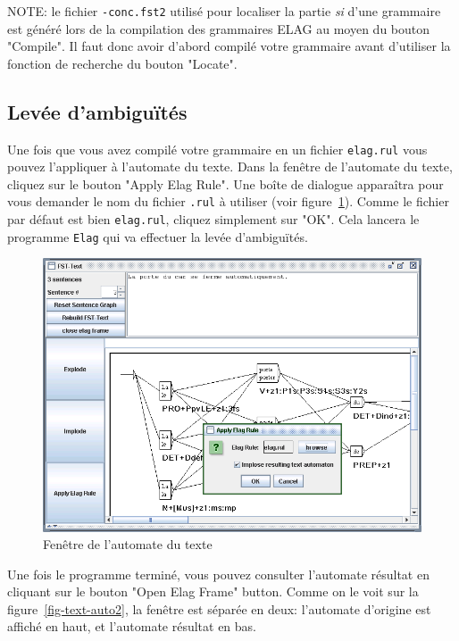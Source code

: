 \bigskip
\noindent NOTE: le fichier \verb+-conc.fst2+ utilisé pour localiser la partie \textit{si}
d’une grammaire est généré lors de la compilation des grammaires ELAG au moyen du bouton
"Compile". Il faut donc avoir d’abord compilé votre grammaire avant d’utiliser la fonction
de recherche du bouton "Locate".


\subsection{Levée d’ambiguïtés}
Une fois que vous avez compilé votre grammaire en un fichier \verb+elag.rul+                                                                                  vous pouvez
l’appliquer à l’automate du texte. Dans la fenêtre de l’automate du texte, cliquez sur le bouton 
"Apply Elag Rule". Une boîte de dialogue apparaîtra pour vous demander le nom du fichier \verb+.rul+
à utiliser (voir figure~\ref{fig-text-auto1}). Comme le fichier par défaut est bien \verb+elag.rul+,
cliquez simplement sur "OK". Cela lancera le programme \verb+Elag+ qui va effectuer la levée d’ambiguïtés.

\begin{figure}[!ht]
\begin{center}
\includegraphics[width=12cm]{resources/img/fig7-17.png}
\caption{Fenêtre de l’automate du texte \label{fig-text-auto1}}
\end{center}
\end{figure}

\bigskip
\noindent Une fois le programme terminé, vous pouvez consulter l’automate résultat en cliquant
sur le bouton "Open Elag Frame" button. Comme on le voit sur la figure~\ref{fig-text-auto2},
la fenêtre est séparée en deux: l’automate d’origine est affiché en haut, et l’automate résultat en bas.


